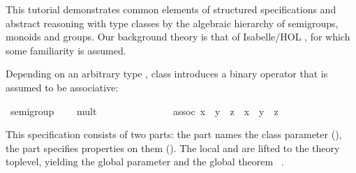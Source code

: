 \begin{isabellebody}
\begin{isamarkuptext}
  This tutorial demonstrates common elements of structured
  specifications and abstract reasoning with type classes by the
  algebraic hierarchy of semigroups, monoids and groups.  Our
  background theory is that of Isabelle/HOL \cite{isa-tutorial}, for
  which some familiarity is assumed.%
\end{isamarkuptext}%
\isamarkuptrue%
%
\isamarkuptrue%
%
\isamarkuptrue%
%
\begin{isamarkuptext}%
Depending on an arbitrary type \isa{{\isasymalpha}}, class  introduces a binary operator \isa{{\isacharparenleft}{\isasymotimes}{\isacharparenright}} that is
  assumed to be associative:%
\end{isamarkuptext}%
\isamarkuptrue%
%
\isadelimquote
%
\endisadelimquote
%
\isatagquote
{}\isamarkupfalse%
\ semigroup\ {\isacharequal}\isanewline
\ \ \ mult\ {\isacharcolon}{\isacharcolon}\ {\isachardoublequoteopen}{\isasymalpha}\ {\isasymRightarrow}\ {\isasymalpha}\ {\isasymRightarrow}\ {\isasymalpha}{\isachardoublequoteclose}\ \ \ \ {\isacharparenleft}\ {\isachardoublequoteopen}{\isasymotimes}{\isachardoublequoteclose}\ {}{}{\isacharparenright}\isanewline
\ \ \ assoc{\isacharcolon}\ {\isachardoublequoteopen}{\isacharparenleft}x\ {\isasymotimes}\ y{\isacharparenright}\ {\isasymotimes}\ z\ {\isacharequal}\ x\ {\isasymotimes}\ {\isacharparenleft}y\ {\isasymotimes}\ z{\isacharparenright}{\isachardoublequoteclose}%
\endisatagquote
{\isafoldquote}%
%
\isadelimquote
%
\endisadelimquote
%
\begin{isamarkuptext}%
\noindent This \hyperlink{command.class}{\mbox{}} specification consists of two parts:
  the  part names the class parameter (\hyperlink{element.fixes}{\mbox{}}), the  part specifies properties on them
  (\hyperlink{element.assumes}{\mbox{}}).  The local \hyperlink{element.fixes}{\mbox{}} and \hyperlink{element.assumes}{\mbox{}} are lifted to the theory toplevel, yielding the global
  parameter  and the
  global theorem \hyperlink{fact.semigroup.assoc:}{\mbox{}}~.%

\end{isamarkuptext}
\end{isabellebody}
